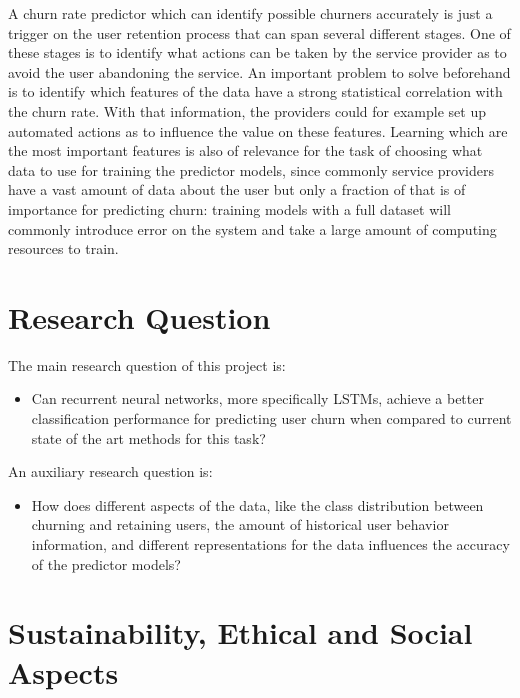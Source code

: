 \documentclass{kththesis}
\begin{document}
A churn rate predictor which can identify possible churners accurately is just a trigger on the user retention process that can span several different stages. One of these stages is to identify what actions can be taken by the service provider as to avoid the user abandoning the service. An important problem to solve beforehand is to identify which features of the data have a strong statistical correlation with the churn rate. With that information, the providers could for example set up automated actions as to influence the value on these features. Learning which are the most important features is also of relevance for the task of choosing what data to use for training the predictor models, since commonly service providers have a vast amount of data about the user but only a fraction of that is of importance for predicting churn: training models with a full dataset will commonly introduce error on the system and take a large amount of computing resources to train.
	
\section{Research Question}	
	
The main research question of this project is:

\begin{itemize}
\item Can recurrent neural networks, more specifically LSTMs, achieve a better classification performance for predicting user churn when compared to current state of the art methods for this task?
\end{itemize}	

An auxiliary research question is:

\begin{itemize}
\item How does different aspects of the data, like the class distribution between churning and retaining users, the amount of historical user behavior information, and different representations for the data influences the accuracy of the predictor models?
\end{itemize}


\section{Sustainability, Ethical and Social Aspects}
\end{document}
